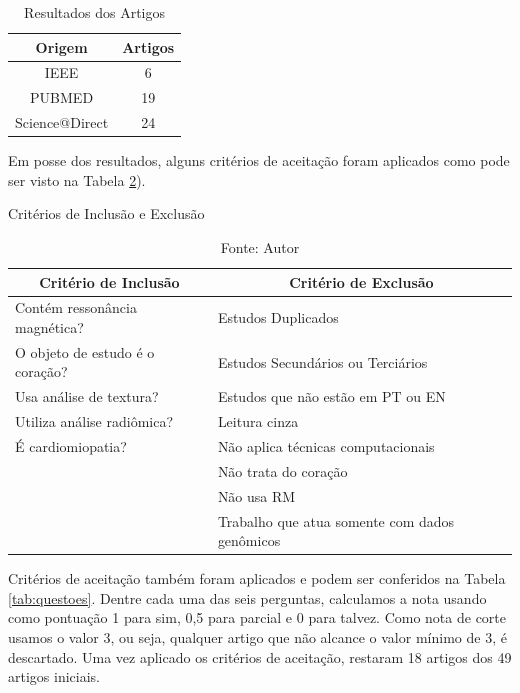 \begin{table}[hbtp]
    \centering
    \renewcommand{\arraystretch}{1.4} %
    \begin{tabular}{|c|c|}
    \hline 
          \textbf{Origem} & \textbf{Artigos}  \\ 
    \hline 
        IEEE & 6 \\ 
        PUBMED & 19 \\ 
        Science@Direct & 24 \\ 
    \hline 
    \end{tabular} 
    \caption{Resultados dos Artigos}
    \label{tab:resultado_busca}
\end{table}

Em posse dos resultados, alguns critérios de aceitação foram aplicados como pode ser visto na Tabela \ref{tab:criterios}).

\begin{table}[hbtp]
    \centering
    \caption{Critérios de Inclusão e Exclusão}
    \renewcommand{\arraystretch}{1.4} %
    \begin{tabular}{|l|l|}
    \hline 
          \multicolumn{1}{|c|}{\textbf{Critério de Inclusão}} & \multicolumn{1}{c|}{\textbf{Critério de Exclusão}}  \\ 
    \hline 
        \quad Contém ressonância magnética? & \quad Estudos Duplicados   \\ 
        \quad O objeto de estudo é o coração? & \quad Estudos Secundários ou Terciários \\
        \quad Usa análise de textura? & \quad Estudos que não estão em PT ou EN\\
        \quad Utiliza análise radiômica? & \quad Leitura cinza  \\
        \quad É cardiomiopatia? & \quad Não aplica técnicas computacionais\\
        & \quad Não trata do coração \\
        & \quad Não usa RM \\
        & \quad Trabalho que atua somente com dados genômicos \\ 
    \hline 
    \end{tabular} 
    \caption*{Fonte: Autor}
    \label{tab:criterios}
\end{table}

Critérios de aceitação também foram aplicados e podem ser conferidos na Tabela \ref{tab:questoes}. Dentre cada uma das seis perguntas, calculamos a nota usando como pontuação 1 para sim, 0,5 para parcial e 0 para talvez. Como nota de corte usamos o valor 3, ou seja, qualquer artigo que não alcance o valor mínimo de 3, é descartado. Uma vez aplicado os critérios de aceitação, restaram 18 artigos dos 49 artigos iniciais.

